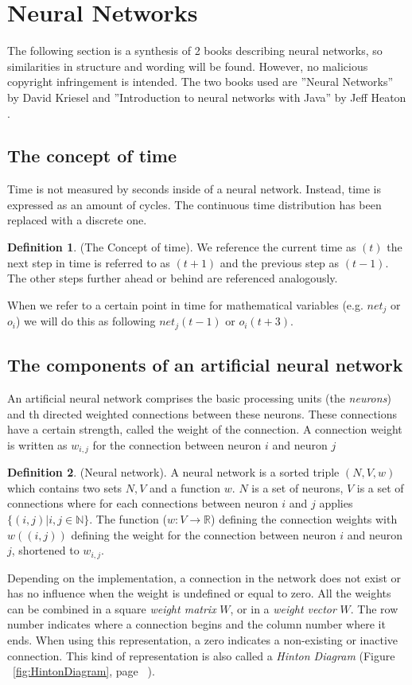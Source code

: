 \documentclass[pdftex,a4paper,12pt,twoside]{report}
\theoremstyle{plain} \newtheorem{theorem}{Theorem} \newtheorem{proposition}{Proposition} \newtheorem{lemma}{Lemma} \newtheorem*{corollary}{Corollary}
\theoremstyle{definition} \newtheorem{definition}{Definition} \newtheorem{conjecture}{Conjecture} \newtheorem*{example}{Example} \newtheorem{algorithm}{Algorithm}
\theoremstyle{remark} \newtheorem*{remark}{Remark} \newtheorem*{note}{Note} \newtheorem{case}{Case}
\begin{document}
\section{Neural Networks}
\label{sec:neuralnetworks}
The following section is a synthesis of 2 books describing neural networks, so similarities in structure and wording will be found. However, no malicious copyright infringement is intended. The two books used are ''Neural Networks'' by David Kriesel \citep{Kriesel2013} and ''Introduction to neural networks with Java'' by Jeff Heaton \citep{Heaton2005}.
\subsection{The concept of time}
Time is not measured by seconds inside of a neural network. Instead, time is expressed as an amount of cycles. The continuous time distribution has been replaced with a discrete one.
\begin{definition}(The Concept of time). We reference the current time as $(t)$ the next step in time is referred to as $(t+1)$ and the previous step as $(t-1)$. The other steps further ahead or behind are referenced analogously. \end{definition} When we refer to a certain point in time for mathematical variables (e.g. $net_j$ or $o_i$) we will do this as following $net_j(t-1)$ or $o_i(t+3)$.
\subsection{The components of an artificial neural network}
An artificial neural network comprises the basic processing units (the \emph{neurons}) and th directed weighted connections between these neurons. These connections have a certain strength, called the weight of the connection. A connection weight is written as $w_{i,j}$ for the connection between neuron $i$ and neuron $j$
\begin{definition}
(Neural network). A neural network is a sorted triple $(N, V, w)$ which contains two sets $N, V$ and a function $w$. $N$ is a set of neurons, $V$ is a set of connections where for each connections between neuron $i$ and $j$ applies $\{(i,j)|i,j \in  \mathbb{N}\}$. The function ($w : V \to \mathbb{R}$) defining the connection weights with $w((i,j))$ defining the weight for the connection between neuron $i$ and neuron $j$, shortened to $w_{i,j}$.
\end{definition} Depending on the implementation, a connection in the network does not exist or has no influence when the weight is undefined or equal to zero. All the weights can be combined in a square \emph{weight matrix} $W$, or in a \emph{weight vector} $W$. The row number indicates where a connection begins and the column number where it ends. When using this representation, a zero indicates a non-existing or inactive connection. This kind of representation is also called a \emph{Hinton Diagram} (Figure ~\ref{fig:HintonDiagram}, page ~\pageref{fig:HintonDiagram}).
\end{document}

